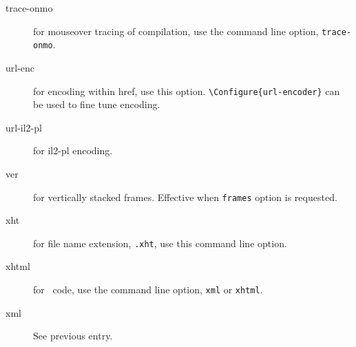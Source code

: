 \begin{description}

\item[trace-onmo] for mouseover tracing of compilation, use the
  command line option, \verb=trace-onmo=.



\item[url-enc] for \space encoding within href, use this
  option.  \verb=\Configure{url-encoder}= can be used to fine tune
  encoding.

\item[url-il2-pl] for il2-pl  encoding.

\item[ver] for vertically stacked frames. Effective when \verb=frames=
  option is requested.


\item[xht] for file name extension, \verb=.xht=, use this command line
  option.

\item[xhtml] for \xml\ code, use the command line option, \verb=xml= or
  \verb=xhtml=.

\item[xml] See previous entry.


\end{description}
\endgroup
